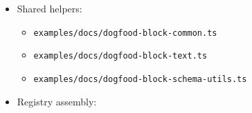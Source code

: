 \begin{itemize}
\tightlist
\item
  Shared helpers:

  \begin{itemize}
  \tightlist
  \item
    \texttt{e\allowbreak{}x\allowbreak{}a\allowbreak{}m\allowbreak{}p\allowbreak{}l\allowbreak{}e\allowbreak{}s\allowbreak{}/\allowbreak{}d\allowbreak{}o\allowbreak{}c\allowbreak{}s\allowbreak{}/\allowbreak{}d\allowbreak{}o\allowbreak{}g\allowbreak{}f\allowbreak{}o\allowbreak{}o\allowbreak{}d\allowbreak{}-\allowbreak{}b\allowbreak{}l\allowbreak{}o\allowbreak{}c\allowbreak{}k\allowbreak{}-\allowbreak{}c\allowbreak{}o\allowbreak{}m\allowbreak{}m\allowbreak{}o\allowbreak{}n\allowbreak{}.\allowbreak{}t\allowbreak{}s}
  \item
    \texttt{e\allowbreak{}x\allowbreak{}a\allowbreak{}m\allowbreak{}p\allowbreak{}l\allowbreak{}e\allowbreak{}s\allowbreak{}/\allowbreak{}d\allowbreak{}o\allowbreak{}c\allowbreak{}s\allowbreak{}/\allowbreak{}d\allowbreak{}o\allowbreak{}g\allowbreak{}f\allowbreak{}o\allowbreak{}o\allowbreak{}d\allowbreak{}-\allowbreak{}b\allowbreak{}l\allowbreak{}o\allowbreak{}c\allowbreak{}k\allowbreak{}-\allowbreak{}t\allowbreak{}e\allowbreak{}x\allowbreak{}t\allowbreak{}.\allowbreak{}t\allowbreak{}s}
  \item
    \texttt{e\allowbreak{}x\allowbreak{}a\allowbreak{}m\allowbreak{}p\allowbreak{}l\allowbreak{}e\allowbreak{}s\allowbreak{}/\allowbreak{}d\allowbreak{}o\allowbreak{}c\allowbreak{}s\allowbreak{}/\allowbreak{}d\allowbreak{}o\allowbreak{}g\allowbreak{}f\allowbreak{}o\allowbreak{}o\allowbreak{}d\allowbreak{}-\allowbreak{}b\allowbreak{}l\allowbreak{}o\allowbreak{}c\allowbreak{}k\allowbreak{}-\allowbreak{}s\allowbreak{}c\allowbreak{}h\allowbreak{}e\allowbreak{}m\allowbreak{}a\allowbreak{}-\allowbreak{}u\allowbreak{}t\allowbreak{}i\allowbreak{}l\allowbreak{}s\allowbreak{}.\allowbreak{}t\allowbreak{}s}
  \end{itemize}
\item
  Registry assembly:


\end{itemize}
